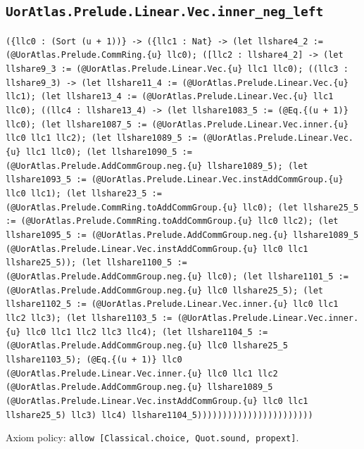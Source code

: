 \documentclass[11pt]{article}
\begin{document}
\subsection*{\texttt{UorAtlas.Prelude.Linear.Vec.inner\_neg\_left}}
\noindent\texttt{(\{llc0 : (Sort (u + 1))\} -> (\{llc1 : Nat\} -> (let llshare4\_2 := (@UorAtlas.Prelude.CommRing.\{u\} llc0); ([llc2 : llshare4\_2] -> (let llshare9\_3 := (@UorAtlas.Prelude.Linear.Vec.\{u\} llc1 llc0); ((llc3 : llshare9\_3) -> (let llshare11\_4 := (@UorAtlas.Prelude.Linear.Vec.\{u\} llc1); (let llshare13\_4 := (@UorAtlas.Prelude.Linear.Vec.\{u\} llc1 llc0); ((llc4 : llshare13\_4) -> (let llshare1083\_5 := (@Eq.\{(u + 1)\} llc0); (let llshare1087\_5 := (@UorAtlas.Prelude.Linear.Vec.inner.\{u\} llc0 llc1 llc2); (let llshare1089\_5 := (@UorAtlas.Prelude.Linear.Vec.\{u\} llc1 llc0); (let llshare1090\_5 := (@UorAtlas.Prelude.AddCommGroup.neg.\{u\} llshare1089\_5); (let llshare1093\_5 := (@UorAtlas.Prelude.Linear.Vec.instAddCommGroup.\{u\} llc0 llc1); (let llshare23\_5 := (@UorAtlas.Prelude.CommRing.toAddCommGroup.\{u\} llc0); (let llshare25\_5 := (@UorAtlas.Prelude.CommRing.toAddCommGroup.\{u\} llc0 llc2); (let llshare1095\_5 := (@UorAtlas.Prelude.AddCommGroup.neg.\{u\} llshare1089\_5 (@UorAtlas.Prelude.Linear.Vec.instAddCommGroup.\{u\} llc0 llc1 llshare25\_5)); (let llshare1100\_5 := (@UorAtlas.Prelude.AddCommGroup.neg.\{u\} llc0); (let llshare1101\_5 := (@UorAtlas.Prelude.AddCommGroup.neg.\{u\} llc0 llshare25\_5); (let llshare1102\_5 := (@UorAtlas.Prelude.Linear.Vec.inner.\{u\} llc0 llc1 llc2 llc3); (let llshare1103\_5 := (@UorAtlas.Prelude.Linear.Vec.inner.\{u\} llc0 llc1 llc2 llc3 llc4); (let llshare1104\_5 := (@UorAtlas.Prelude.AddCommGroup.neg.\{u\} llc0 llshare25\_5 llshare1103\_5); (@Eq.\{(u + 1)\} llc0 (@UorAtlas.Prelude.Linear.Vec.inner.\{u\} llc0 llc1 llc2 (@UorAtlas.Prelude.AddCommGroup.neg.\{u\} llshare1089\_5 (@UorAtlas.Prelude.Linear.Vec.instAddCommGroup.\{u\} llc0 llc1 llshare25\_5) llc3) llc4) llshare1104\_5)))))))))))))))))))))))}\par
\noindent Axiom policy: \texttt{allow [Classical.choice, Quot.sound, propext]}.\par
\end{document}
